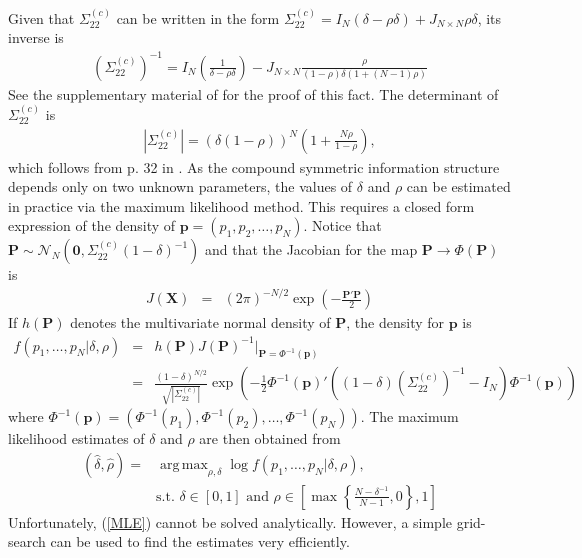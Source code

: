 \documentclass[11pt,twoside]{article}
\DeclareMathOperator*{\argmax}{arg\,max}
\theoremstyle{definition}
\theoremstyle{definition}
\begin{document}
Given that $\Sigma_{22}^{(c)}$ can be written in the form  $\Sigma_{22}^{(c)} = I_N (\delta-\rho\delta) + J_{N \times N} \rho\delta$, its inverse is
\begin{align}
\left(\Sigma_{22}^{(c)}\right)^{-1} = I_N \left(\frac{1}{\delta-\rho\delta} \right) - J_{N \times N} \frac{\rho}{(1-\rho)\delta(1+(N-1) \rho)} \label{inverse}
\end{align}
See the supplementary material of \cite{dobbin2005sample} for the proof of this fact.  The determinant of $\Sigma_{22}^{(c)}$ is
\begin{align}
| \Sigma_{22}^{(c)}| = (\delta(1- \rho))^N \left(1+\frac{N \rho}{1 - \rho} \right),\label{determinant}
\end{align}
which follows from p. 32 in \cite{rao2009linear}. As the compound symmetric information structure depends only on two unknown parameters, the values of $\delta$ and $\rho$ can be estimated in practice via the maximum likelihood method. This requires a closed form expression of the density of $\boldsymbol{p} = (p_1, p_2, \dots, p_N)$. Notice that $\boldsymbol{P} \sim \mathcal{N}_N(\boldsymbol{0}, \Sigma_{22}^{(c)} (1-\delta)^{-1})$ and that the Jacobian for the map $\boldsymbol{P} \to \Phi\left(\boldsymbol{P}\right)$ is
\begin{eqnarray*}
J(\boldsymbol{X}) &=& (2\pi)^{-N/2} \exp \left( - \frac{\boldsymbol{P}' \boldsymbol{P}}{2}   \right) 
\end{eqnarray*}
If $h(\boldsymbol{P})$ denotes the multivariate normal density of $\boldsymbol{P}$,  
the density for $\boldsymbol{p}$ is 
\begin{eqnarray*}
 f\left(p_1, \dots, p_N | \delta, \rho \right) &=& h(\boldsymbol{P}) J(\boldsymbol{P})^{-1} \bigg|_{\boldsymbol{P} = \Phi^{-1}(\boldsymbol{p})}\\
&=& \frac{(1-\delta)^{N/2}}{\sqrt{ |\Sigma_{22}^{(c)}|}} \exp\left( -\frac{1}{2} \Phi^{-1}(\boldsymbol{p})' \left( (1-\delta) \left(\Sigma_{22}^{(c)}\right)^{-1} - I_N \right) \Phi^{-1}(\boldsymbol{p})  \right) 
\end{eqnarray*}
where $\Phi^{-1}(\boldsymbol{p}) =  (\Phi^{-1}(p_1), \Phi^{-1}(p_2), \dots, \Phi^{-1}(p_N))$. The maximum likelihood estimates of $\delta$ and $\rho$ are then obtained from
\begin{align}
(\hat{\delta}, \hat{\rho}) =& \argmax_{\rho, \delta} \log  f\left(p_1, \dots, p_N | \delta, \rho \right), \label{MLE}\\
& \text{s.t. } \nonumber \delta \in [0,1] \text{ and } \rho \in \left[  \max \left\{ \frac{N-\delta^{-1}}{N-1}, 0\right\}, 1 \right]
\end{align}
Unfortunately, (\ref{MLE}) cannot be solved analytically. However, a simple grid-search can be used to find the estimates very efficiently. 
\end{document}
